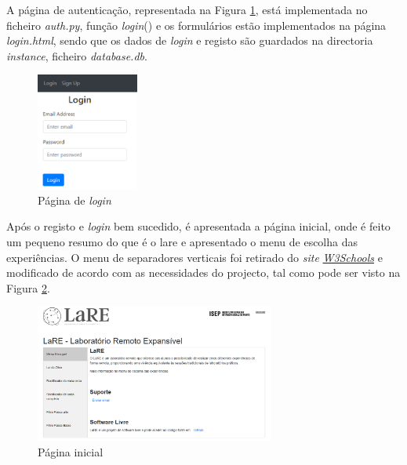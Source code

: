 A página de autenticação, representada na Figura \ref{fig:paglogin}, está implementada no ficheiro \textit{auth.py}, função \textit{login}() e os formulários estão implementados na página \textit{login.html}, sendo que os dados de \textit{login} e registo são guardados na directoria \textit{instance}, ficheiro \textit{database.db}.

\begin{figure}[hbtp]
	\centering
	\includegraphics[width=0.3\textwidth]{figures/login.png}
	\caption{Página de \textit{login}}
	\label{fig:paglogin}
\end{figure}




Após o registo e \textit{login} bem sucedido, é apresentada a página inicial, onde é feito um pequeno resumo do que é o \acrshort{lare} e apresentado o menu de escolha das experiências. O menu de separadores verticais foi retirado do \textit{site} \href{https://www.w3schools.com/howto/howto_js_vertical_tabs.asp}{\textit{W3Schools}} e modificado de acordo com as necessidades do projecto, tal como pode ser visto na Figura \ref{fig:pagmenu}.

\begin{figure}[hbtp]
	\centering
	\includegraphics[width=0.7\textwidth]{figures/menupage.png}
	\caption{Página inicial}
	\label{fig:pagmenu}
\end{figure}

